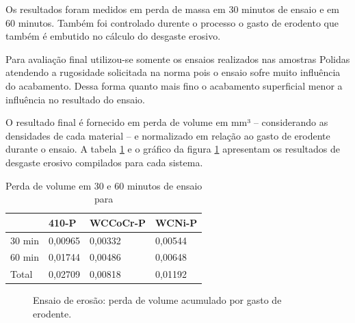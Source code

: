 Os resultados foram medidos em perda de massa em 30 minutos de ensaio e em 60
minutos. Também foi controlado durente o processo o gasto de erodento que
também é embutido no cálculo do desgaste erosivo.

Para avaliação final utilizou-se somente os ensaios realizados nas amostras
Polidas atendendo a rugosidade  solicitada na norma pois o ensaio sofre muito
influência do acabamento. Dessa forma quanto mais fino o acabamento superficial
menor a influência no resultado do ensaio.

O resultado final é fornecido em perda de volume em mm³ – considerando as
densidades de cada material – e normalizado em relação ao gasto de erodente
durante o ensaio. A tabela \ref{tab:perda_vol} e o gráfico da figura
\ref{fig:ensaio_erosao} apresentam os resultados de desgaste erosivo compilados
para cada sistema.


\begin{table}[H]
\centering

\begin{tabular}{llll}
         & 410-P   & WCCoCr-P & WCNi-P  \\ \hline
 30 min  & 0,00965 & 0,00332  & 0,00544 \\ \hline
 60 min  & 0,01744 & 0,00486 &  0,00648  \\ \hline
 Total   & 0,02709 & 0,00818 &  0,01192   
\end{tabular}
\caption{Perda de volume em 30 e 60 minutos de ensaio para}
\label{tab:perda_vol}
\end{table}

\begin{figure}[h!]
\centering
{}
\caption{Ensaio de erosão: perda de volume acumulado por gasto de erodente.}
\label{fig:ensaio_erosao}
\end{figure}

